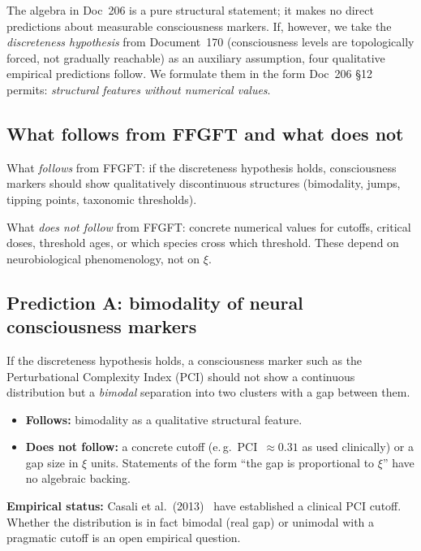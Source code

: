 The algebra in Doc~206 is a pure structural statement; it makes no direct predictions about measurable consciousness markers. If, however, we take the \emph{discreteness hypothesis} from Document~170 (consciousness levels are topologically forced, not gradually reachable) as an auxiliary assumption, four qualitative empirical predictions follow. We formulate them in the form Doc~206 \S12 permits: \emph{structural features without numerical values}.

\subsection{What follows from FFGFT and what does not}\label{sec:predictions_follows}

\begin{important}
What \emph{follows} from FFGFT: if the discreteness hypothesis holds, consciousness markers should show qualitatively discontinuous structures (bimodality, jumps, tipping points, taxonomic thresholds).

What \emph{does not follow} from FFGFT: concrete numerical values for cutoffs, critical doses, threshold ages, or which species cross which threshold. These depend on neurobiological phenomenology, not on $\xi$.
\end{important}

\subsection{Prediction A: bimodality of neural consciousness markers}\label{sec:predictionA}

If the discreteness hypothesis holds, a consciousness marker such as the Perturbational Complexity Index (PCI) should not show a continuous distribution but a \emph{bimodal} separation into two clusters with a gap between them.

\begin{itemize}
\item \textbf{Follows:} bimodality as a qualitative structural feature.
\item \textbf{Does not follow:} a concrete cutoff (e.\,g.\ PCI~$\approx 0.31$ as used clinically) or a gap size in $\xi$ units. Statements of the form ``the gap is proportional to $\xi$'' have no algebraic backing.
\end{itemize}

\textbf{Empirical status:} Casali et al.~(2013)~\cite{Casali2013} have established a clinical PCI cutoff. Whether the distribution is in fact bimodal (real gap) or unimodal with a pragmatic cutoff is an open empirical question.


